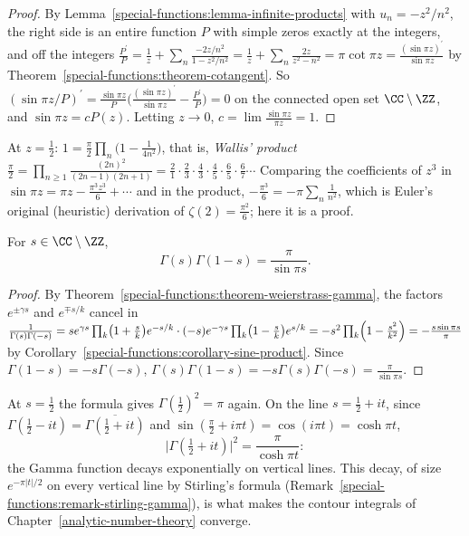 \begin{proof}
By Lemma~\ref{special-functions:lemma-infinite-products} with $u_n = -z^2/n^2$, the right side is an entire function $P$ with simple zeros exactly at the integers, and off the integers
$\frac{P^{\prime}}{P} = \frac1z + \sum_n\frac{-2z/n^2}{1 - z^2/n^2} = \frac1z + \sum_n\frac{2z}{z^2 - n^2} = \pi\cot\pi z = \frac{(\sin\pi z)^{\prime}}{\sin\pi z}$ by Theorem~\ref{special-functions:theorem-cotangent}.
So $(\sin\pi z/P)^{\prime} = \frac{\sin\pi z}{P}\bigl(\frac{(\sin\pi z)^{\prime}}{\sin\pi z} - \frac{P^{\prime}}{P}\bigr) = 0$ on the connected open set $\CC \setminus \ZZ$, and $\sin\pi z = cP(z)$. Letting $z \to 0$,
$c = \lim\frac{\sin\pi z}{\pi z} = 1$.
\end{proof}

\begin{example}\label{special-functions:example-wallis}
At $z = \frac12$: $1 = \frac\pi2\prod_n\bigl(1 - \frac{1}{4n^2}\bigr)$, that is, \emph{Wallis' product} $\frac\pi2 = \prod_{n \geq 1}\frac{(2n)^2}{(2n - 1)(2n + 1)} = \frac21\cdot\frac23\cdot\frac43\cdot\frac45\cdot\frac65\cdot\frac67\cdots$
Comparing the coefficients of $z^3$ in $\sin\pi z = \pi z - \frac{\pi^3z^3}{6} + \cdots$ and in the product, $-\frac{\pi^3}{6} = -\pi\sum_n\frac1{n^2}$, which is Euler's original (heuristic) derivation of
$\zeta(2) = \frac{\pi^2}{6}$; here it is a proof.
\end{example}

\begin{theorem}\label{special-functions:theorem-reflection}
For $s \in \CC \setminus \ZZ$,
\[
\Gamma(s)\Gamma(1 - s) = \frac{\pi}{\sin\pi s}.
\]
\end{theorem}

\begin{proof}
By Theorem~\ref{special-functions:theorem-weierstrass-gamma}, the factors $e^{\pm\gamma s}$ and $e^{\mp s/k}$ cancel in
$\frac{1}{\Gamma(s)\Gamma(-s)} = se^{\gamma s}\prod_k\bigl(1 + \frac sk\bigr)e^{-s/k}\cdot(-s)e^{-\gamma s}\prod_k\bigl(1 - \frac sk\bigr)e^{s/k} = -s^2\prod_k\Bigl(1 - \frac{s^2}{k^2}\Bigr) = -\frac{s\sin\pi s}{\pi}$
by Corollary~\ref{special-functions:corollary-sine-product}. Since $\Gamma(1 - s) = -s\Gamma(-s)$, $\Gamma(s)\Gamma(1 - s) = -s\Gamma(s)\Gamma(-s) = \frac{\pi}{\sin\pi s}$.
\end{proof}

\begin{example}\label{special-functions:example-reflection}
At $s = \frac12$ the formula gives $\Gamma(\frac12)^2 = \pi$ again. On the line $s = \frac12 + it$, since $\Gamma(\frac12 - it) = \overline{\Gamma(\frac12 + it)}$ and
$\sin(\frac\pi2 + i\pi t) = \cos(i\pi t) = \cosh\pi t$,
\[
\bigl|\Gamma(\tfrac12 + it)\bigr|^2 = \frac{\pi}{\cosh\pi t}:
\]
the Gamma function decays exponentially on vertical lines. This decay, of size $e^{-\pi|t|/2}$ on every vertical line by Stirling's formula (Remark~\ref{special-functions:remark-stirling-gamma}), is what
makes the contour integrals of Chapter~\ref{analytic-number-theory} converge.
\end{example}

